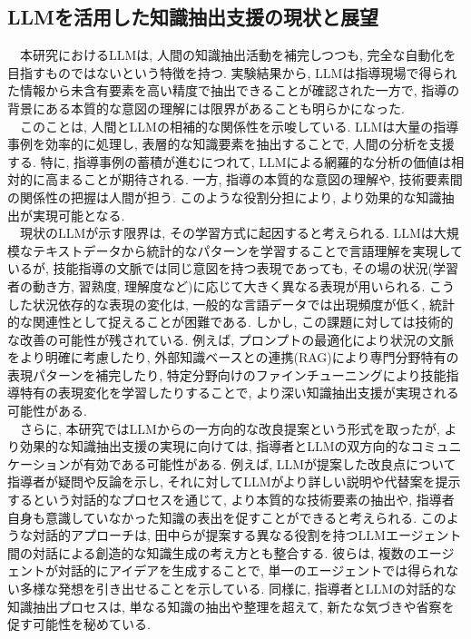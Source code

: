 \subsection{LLMを活用した知識抽出支援の現状と展望}
　本研究におけるLLMは, 人間の知識抽出活動を補完しつつも, 完全な自動化を目指すものではないという特徴を持つ. 実験結果から, LLMは指導現場で得られた情報から未含有要素を高い精度で抽出できることが確認された一方で, 指導の背景にある本質的な意図の理解には限界があることも明らかになった.\\
　このことは, 人間とLLMの相補的な関係性を示唆している. LLMは大量の指導事例を効率的に処理し, 表層的な知識要素を抽出することで, 人間の分析を支援する. 特に, 指導事例の蓄積が進むにつれて, LLMによる網羅的な分析の価値は相対的に高まることが期待される. 一方, 指導の本質的な意図の理解や, 技術要素間の関係性の把握は人間が担う. このような役割分担により, より効果的な知識抽出が実現可能となる.\\
　現状のLLMが示す限界は, その学習方式に起因すると考えられる. LLMは大規模なテキストデータから統計的なパターンを学習することで言語理解を実現しているが, 技能指導の文脈では同じ意図を持つ表現であっても, その場の状況(学習者の動き方, 習熟度, 理解度など)に応じて大きく異なる表現が用いられる. こうした状況依存的な表現の変化は, 一般的な言語データでは出現頻度が低く, 統計的な関連性として捉えることが困難である. しかし, この課題に対しては技術的な改善の可能性が残されている. 例えば, プロンプトの最適化により状況の文脈をより明確に考慮したり, 外部知識ベースとの連携(RAG)により専門分野特有の表現パターンを補完したり, 特定分野向けのファインチューニングにより技能指導特有の表現変化を学習したりすることで, より深い知識抽出支援が実現される可能性がある.\\
　さらに, 本研究ではLLMからの一方向的な改良提案という形式を取ったが, より効果的な知識抽出支援の実現に向けては, 指導者とLLMの双方向的なコミュニケーションが有効である可能性がある. 例えば, LLMが提案した改良点について指導者が疑問や反論を示し, それに対してLLMがより詳しい説明や代替案を提示するという対話的なプロセスを通じて, より本質的な技術要素の抽出や, 指導者自身も意識していなかった知識の表出を促すことができると考えられる. このような対話的アプローチは, 田中ら\cite{Tanaka2024}が提案する異なる役割を持つLLMエージェント間の対話による創造的な知識生成の考え方とも整合する. 彼らは, 複数のエージェントが対話的にアイデアを生成することで, 単一のエージェントでは得られない多様な発想を引き出せることを示している. 同様に, 指導者とLLMの対話的な知識抽出プロセスは, 単なる知識の抽出や整理を超えて, 新たな気づきや省察を促す可能性を秘めている.\\



